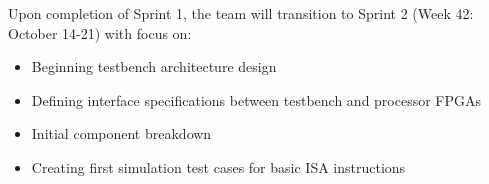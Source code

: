 \documentclass[10pt]{article}
\begin{document}
Upon completion of Sprint 1, the team will transition to Sprint 2 (Week 42: October 14-21) with focus on:
\begin{itemize}
    \item Beginning testbench architecture design
    \item Defining interface specifications between testbench and processor FPGAs
    \item Initial component breakdown 
    \item Creating first simulation test cases for basic ISA instructions
\end{itemize}
\end{document}
